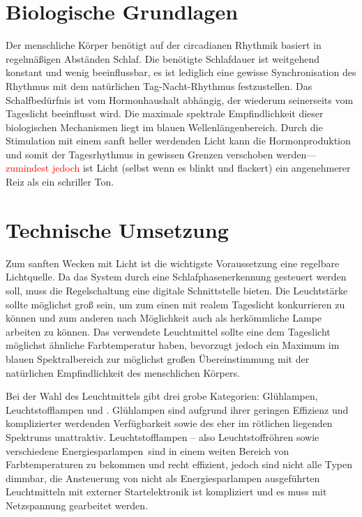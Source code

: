 \documentclass[12pt,a4paper,notitlepage]{article}
\newcommand{\annot}[1]{\textcolor{red}{#1}}
\begin{document}
\section{Biologische Grundlagen}
Der menschliche Körper benötigt auf der circadianen Rhythmik basiert in regelmäßigen Abständen Schlaf. Die benötigte Schlafdauer ist weitgehend konstant und wenig beeinflussbar, es ist lediglich eine gewisse Synchronisation des Rhythmus mit dem natürlichen Tag-Nacht-Rhythmus festzustellen. Das Schalfbedürfnis ist vom Hormonhaushalt abhängig\cite{WP9}, der wiederum seinerseits vom Tageslicht beeinflusst wird. Die maximale spektrale Empfindlichkeit dieser biologischen Mechanismen liegt im blauen Wellenlängenbereich.
\cite{WP5, WP6, WP7, WP8}
Durch die Stimulation mit einem sanft heller werdenden Licht kann die Hormonproduktion und somit der Tagesrhythmus in gewissen Grenzen verschoben werden---\annot{zumindest jedoch} ist Licht (selbst wenn es blinkt und flackert) ein angenehmerer Reiz als ein schriller Ton.

\section{Technische Umsetzung}
Zum sanften Wecken mit Licht ist die wichtigste Voraussetzung eine regelbare Lichtquelle. Da das System durch eine Schlafphasenerkennung gesteuert werden soll, muss die Regelschaltung eine digitale Schnittstelle bieten. Die Leuchtstärke sollte möglichst groß sein, um zum einen mit realem Tageslicht konkurrieren zu können und zum anderen nach Möglichkeit auch als herkömmliche Lampe arbeiten zu können. Das verwendete Leuchtmittel sollte eine dem Tageslicht möglichst ähnliche Farbtemperatur haben, bevorzugt jedoch ein Maximum im blauen Spektralbereich zur möglichst großen Übereinstimmung mit der natürlichen Empfindlichkeit des menschlichen Körpers.

Bei der Wahl des Leuchtmittels gibt drei grobe Kategorien: Glühlampen, Leuchtstofflampen und . Glühlampen sind aufgrund ihrer geringen Effizienz und komplizierter werdenden Verfügbarkeit sowie des eher im rötlichen liegenden Spektrums unattraktiv. Leuchtstofflampen -- also Leuchtstoffröhren sowie verschiedene \glqq Energiesparlampen\grqq\ sind in einem weiten Bereich von Farbtemperaturen zu bekommen und recht effizient, jedoch sind nicht alle Typen dimmbar, die Ansteuerung von nicht als Energiesparlampen ausgeführten Leuchtmitteln mit externer Startelektronik ist kompliziert und es muss mit Netzspannung gearbeitet werden.
\end{document}
